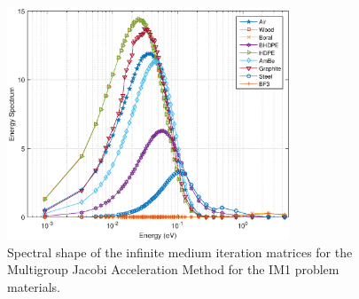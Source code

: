 \begin{figure}
\centering
\includegraphics[width=0.75\textwidth]{figures/sec_DSA/IM1_EC_Rich.eps}
\caption{Spectral shape of the infinite medium iteration matrices for the Multigroup Jacobi Acceleration Method for the IM1 problem materials.}
\label{fig::IM1_mats_EC_Rich}
\end{figure}

